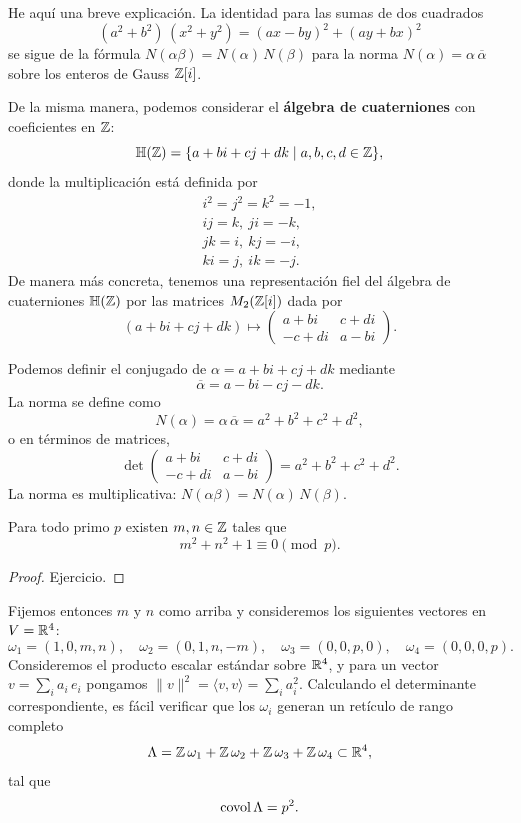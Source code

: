 \begin{comentario}
  He aquí una breve explicación. La identidad para las sumas de dos cuadrados
  $$(a^2 + b^2)\,(x^2 + y^2) = (ax - by)^2 + (ay + bx)^2$$
  se sigue de la fórmula $N (\alpha\beta) = N (\alpha)\,N (\beta)$
  para la norma $N (\alpha) = \alpha\,\overline{\alpha}$ sobre los enteros de
  Gauss $\mathbb{Z} [i]$.

  De la misma manera, podemos considerar el \textbf{álgebra de cuaterniones} con
  coeficientes en $\mathbb{Z}$:
  $$\mathbb{H} (\mathbb{Z}) = \{ a + bi + cj + dk \mid a,b,c,d \in \mathbb{Z} \},$$
  donde la multiplicación está definida por
  \begin{gather*}
    i^2 = j^2 = k^2 = -1,\\
    ij = k, ~ ji = -k, \\
    jk = i, ~ kj = -i, \\
    ki = j, ~ ik = -j.
  \end{gather*}
  De manera más concreta, tenemos una representación fiel del álgebra de
  cuaterniones $\mathbb{H} (\mathbb{Z})$ por las matrices $M_2 (\mathbb{Z} [i])$ dada por
  \[ (a + bi + cj + dk) \mapsto \begin{pmatrix}
    a + bi & c + di \\
    -c + di & a - bi
  \end{pmatrix}. \]

  Podemos definir el conjugado de $\alpha = a + bi + cj + dk$ mediante
  $$\overline{\alpha} = a - bi - cj - dk.$$
  La norma se define como
  $$N (\alpha) = \alpha\,\overline{\alpha} = a^2 + b^2 + c^2 + d^2,$$
  o en términos de matrices,
  \[ \det \begin{pmatrix}
    a + bi & c + di \\
    -c + di & a - bi
  \end{pmatrix} =  a^2 + b^2 + c^2 + d^2. \]
  La norma es multiplicativa: $N (\alpha\beta) = N (\alpha) \, N (\beta)$.
\end{comentario}

\begin{lema}
  Para todo primo $p$ existen $m,n\in\mathbb{Z}$ tales que
  $$m^2 + n^2 + 1 \equiv 0 \pmod{p}.$$

  \begin{proof}
    Ejercicio.
  \end{proof}
\end{lema}

Fijemos entonces $m$ y $n$ como arriba y consideremos los siguientes vectores en
$V = \mathbb{R}^4$:
\[ \omega_1 = (1,0,m,n), \quad
   \omega_2 = (0,1,n,-m), \quad
   \omega_3 = (0,0,p,0), \quad
   \omega_4 = (0,0,0,p). \]
Consideremos el producto escalar estándar sobre $\mathbb{R}^4$, y para un vector
$v = \sum_i a_i \, e_i$ pongamos
$\|v\|^2 = \langle v,v\rangle = \sum_i a_i^2$. Calculando el determinante
correspondiente, es fácil verificar que los $\omega_i$ generan un retículo de
rango completo
$$\Lambda = \mathbb{Z}\,\omega_1 + \mathbb{Z}\,\omega_2 + \mathbb{Z}\,\omega_3 + \mathbb{Z}\,\omega_4 \subset \mathbb{R}^4,$$
tal que
$$\operatorname{covol} \Lambda = p^2.$$

